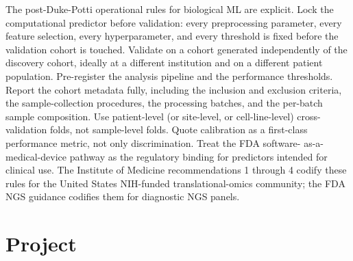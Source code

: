 The post-Duke-Potti operational rules for biological ML are explicit.
Lock the computational predictor before validation: every
preprocessing parameter, every feature selection, every hyperparameter,
and every threshold is fixed before the validation cohort is touched.
Validate on a cohort generated independently of the discovery cohort,
ideally at a different institution and on a different patient
population. Pre-register the analysis pipeline and the performance
thresholds. Report the cohort metadata fully, including the inclusion
and exclusion criteria, the sample-collection procedures, the
processing batches, and the per-batch sample composition. Use
patient-level (or site-level, or cell-line-level) cross-validation
folds, not sample-level folds. Quote calibration as a first-class
performance metric, not only discrimination. Treat the FDA software-
as-a-medical-device pathway as the regulatory binding for predictors
intended for clinical use. The Institute of Medicine recommendations
1 through 4 \cite{paper:v6c11-iom-omics-2012} codify these rules for
the United States NIH-funded translational-omics community; the FDA
NGS guidance \cite{std:v6c11-fda-ngs-2018} codifies them for
diagnostic NGS panels.

\section{Project}

